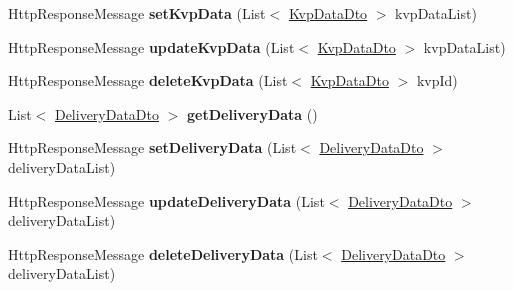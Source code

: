 \begin{DoxyCompactItemize}
Http\+Response\+Message {\bfseries set\+Kvp\+Data} (List$<$ \hyperlink{classkpi_mvc_api_1_1_data_transfer_objects_1_1_kvp_data_dto}{Kvp\+Data\+Dto} $>$ kvp\+Data\+List)
\item 
\mbox{\label{classkpi_mvc_api_1_1_controllers_1_1_kpidata_controller_ac165b3dedfa1744a41af6a1acc07a657}} 
Http\+Response\+Message {\bfseries update\+Kvp\+Data} (List$<$ \hyperlink{classkpi_mvc_api_1_1_data_transfer_objects_1_1_kvp_data_dto}{Kvp\+Data\+Dto} $>$ kvp\+Data\+List)
\item 
\mbox{\label{classkpi_mvc_api_1_1_controllers_1_1_kpidata_controller_a42bfeef2bf903c70d9d8452367ed6dd0}} 
Http\+Response\+Message {\bfseries delete\+Kvp\+Data} (List$<$ \hyperlink{classkpi_mvc_api_1_1_data_transfer_objects_1_1_kvp_data_dto}{Kvp\+Data\+Dto} $>$ kvp\+Id)
\item 
\mbox{\label{classkpi_mvc_api_1_1_controllers_1_1_kpidata_controller_a731d149b7c58ba7de0a45c2eb3110fe1}} 
List$<$ \hyperlink{classkpi_mvc_api_1_1_data_transfer_objects_1_1_delivery_data_dto}{Delivery\+Data\+Dto} $>$ {\bfseries get\+Delivery\+Data} ()
\item 
\mbox{\label{classkpi_mvc_api_1_1_controllers_1_1_kpidata_controller_ae0c16d6b3d009224eae6ea5a2b20aabd}} 
Http\+Response\+Message {\bfseries set\+Delivery\+Data} (List$<$ \hyperlink{classkpi_mvc_api_1_1_data_transfer_objects_1_1_delivery_data_dto}{Delivery\+Data\+Dto} $>$ delivery\+Data\+List)
\item 
\mbox{\label{classkpi_mvc_api_1_1_controllers_1_1_kpidata_controller_a893e7ff73b6dbd31afa5e1aa73e5abae}} 
Http\+Response\+Message {\bfseries update\+Delivery\+Data} (List$<$ \hyperlink{classkpi_mvc_api_1_1_data_transfer_objects_1_1_delivery_data_dto}{Delivery\+Data\+Dto} $>$ delivery\+Data\+List)
\item 
\mbox{\label{classkpi_mvc_api_1_1_controllers_1_1_kpidata_controller_a2494970082b1b00fd50353e4aa840188}} 
Http\+Response\+Message {\bfseries delete\+Delivery\+Data} (List$<$ \hyperlink{classkpi_mvc_api_1_1_data_transfer_objects_1_1_delivery_data_dto}{Delivery\+Data\+Dto} $>$ delivery\+Data\+List)

\end{DoxyCompactItemize}
